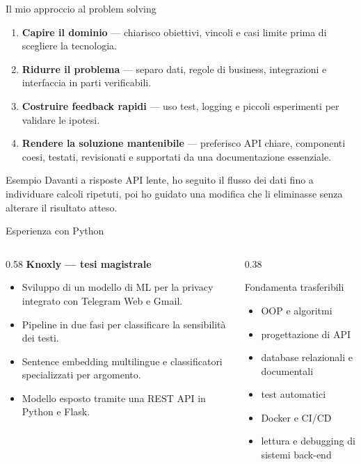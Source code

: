 \documentclass[aspectratio=169,11pt]{beamer}
\begin{document}
\begin{frame}{Il mio approccio al problem solving}
  \begin{enumerate}
    \item \textbf{Capire il dominio} — chiarisco obiettivi, vincoli e casi limite prima di scegliere la tecnologia.
    \item \textbf{Ridurre il problema} — separo dati, regole di business, integrazioni e interfaccia in parti verificabili.
    \item \textbf{Costruire feedback rapidi} — uso test, logging e piccoli esperimenti per validare le ipotesi.
    \item \textbf{Rendere la soluzione mantenibile} — preferisco API chiare, componenti coesi, testati, revisionati e supportati da una documentazione essenziale.
  \end{enumerate}

  \vspace{0.35cm}
  \begin{block}{Esempio}
    Davanti a risposte API lente, ho seguito il flusso dei dati fino a individuare calcoli ripetuti, poi ho guidato una modifica che li eliminasse senza alterare il risultato atteso.
  \end{block}
\end{frame}

\begin{frame}{Esperienza con Python}
  \begin{columns}[T,onlytextwidth]
    \begin{column}{0.58\textwidth}
      \textbf{Knoxly — tesi magistrale}
      \begin{itemize}
        \item Sviluppo di un modello di ML per la privacy integrato con Telegram Web e Gmail.
        \item Pipeline in due fasi per classificare la sensibilità dei testi.
        \item Sentence embedding multilingue e classificatori specializzati per argomento.
        \item Modello esposto tramite una \alert{REST API in Python e Flask}.
      \end{itemize}
    \end{column}
    \begin{column}{0.38\textwidth}
      \begin{block}{Fondamenta trasferibili}
        \begin{itemize}
          \item OOP e algoritmi
          \item progettazione di API
          \item database relazionali e documentali
          \item test automatici
          \item Docker e CI/CD
          \item lettura e debugging di sistemi back-end
        \end{itemize}
      \end{block}
    \end{column}
  \end{columns}
\end{frame}
\end{document}
